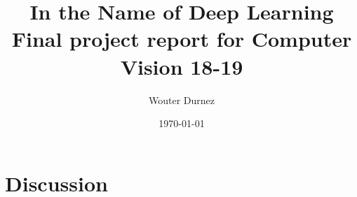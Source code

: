 \documentclass[11pt, a4paper]{article}
\begin{document}


\title{
	\LARGE \textbf{In the Name of Deep Learning} \\
	\vspace{5mm}
	\large Final project report for Computer Vision 18-19
}

\author{Wouter Durnez}
\date{\today}

\maketitle
\tableofcontents
{}
\newpage
{}



















\section{Discussion}
\end{document}
